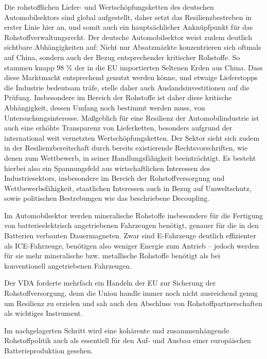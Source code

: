 \documentclass[12pt,a4paper,oneside]{book} %
\begin{document}
Die rohstofflichen Liefer- und Wertschöpfungsketten des deutschen Automobilsektors sind global aufgestellt, daher setzt das Resilienzbestreben in erster Linie hier an, und somit auch ein hauptsächlicher Anknüpfpunkt für das Rohstoffverwaltungsrecht. Der deutsche Automobilsektor weist zudem deutlich sichtbare Abhängigkeiten auf: Nicht nur Absatzmärkte konzentrieren sich oftmals auf China, sondern auch der Bezug entsprechender kritischer Rohstoffe. So stammen knapp 98 \% der in die EU importierten Seltenen Erden aus China.\autocite[4]{gaus_rare_2021} Dass diese Marktmacht entsprechend genutzt werden könne, und etwaige Lieferstopps die Industrie bedeutsam träfe, stelle daher auch Auslandsinvestitionen auf die Prüfung.\autocite[64]{becker_vom_2023} Insbesondere im Bereich der Rohstoffe ist daher diese kritische Abhängigkeit, dessen Umfang noch bestimmt werden muss, von Untersuchungsinteresse. Maßgeblich für eine Resilienz der Automobilindustrie ist auch eine erhöhte Transparenz von Lieferketten, besonders aufgrund der international weit vernetzten Wertschöpfungsketten.\autocite[9]{kagermann_resilienz_2021} Der Sektor sieht sich zudem in der Resilienzbereitschaft durch bereits existierende Rechtsvorschriften, wie denen zum Wettbewerb, in seiner Handlungsfähigkeit beeinträchtigt.\autocite[19]{kagermann_resilienz_2021} Es besteht hierbei also ein Spannungsfeld aus wirtschaftlichen Interessen des Industriesektors, insbesondere im Bereich der Rohstoffversorgung und Wettbewerbsfähigkeit, staatlichen Interessen auch in Bezug auf Umweltschutz, sowie politischen Bestrebungen wie das beschriebene Decoupling.

Im Automobilsektor werden mineralische Rohstoffe insbesondere für die Fertigung von batterieelektrisch angetriebenen Fahrzeugen benötigt, genauer für die in den Batterien verbauten Dauermagneten. Zwar sind E-Fahrzeuge deutlich effizienter als ICE-Fahrzeuge, benötigen also weniger Energie zum Antrieb -- jedoch werden für sie mehr mineralische bzw. metallische Rohstoffe benötigt als bei konventionell angetriebenen Fahrzeugen.

Der VDA forderte mehrfach ein Handeln der EU zur Sicherung der Rohstoffversorgung, denn die Union handle immer noch nicht ausreichend genug um Resilienz zu erzielen und sah auch den Abschluss von Rohstoffpartnerschaften als wichtiges Instrument.\autocite{Horizont  36-37 vom 04.09.2025  Seite 030 }

Im nachgelagerten Schritt wird eine kohärente und zusammenhängende Rohstoffpolitik auch als essentiell für den Auf- und Ausbau einer europäischen Batterieproduktion gesehen.\autocite{bibid}
\end{document}
